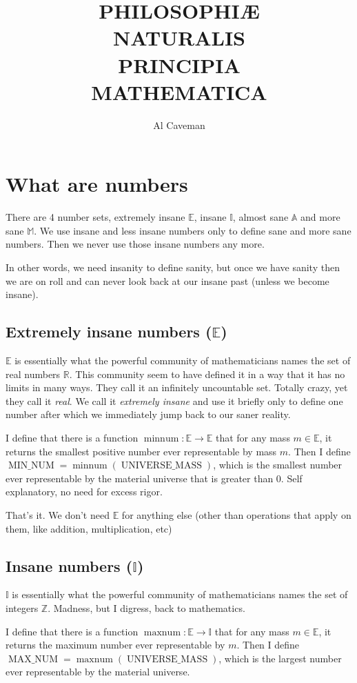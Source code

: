 \documentclass{report}
\title{\Huge\sc \textbf{PHILOSOPHI\AE}\\ NATURALIS\\ \textbf{PRINCIPIA}\\ MATHEMATICA}
\author{Al Caveman}
\DeclareMathOperator{\maxn}{maxnum}
\DeclareMathOperator{\minm}{minnum} \DeclareMathOperator{\maxnum}{MAX\_NUM}
\DeclareMathOperator{\minnum}{MIN\_NUM}
\DeclareMathOperator{\unimass}{UNIVERSE\_MASS}
\begin{document}
\maketitle
\tableofcontents

\chapter{What are numbers}
There are 4 number sets, extremely insane $\mathbb{E}$, insane $\mathbb{I}$,
almost sane $\mathbb{A}$ and more sane $\mathbb{M}$. We use insane and less
insane numbers only to define sane and more sane numbers. Then we never use
those insane numbers any more.

In other words, we need insanity to define sanity, but once we have sanity then
we are on roll and can never look back at our insane past (unless we become
insane).

\section{Extremely insane numbers ($\mathbb{E}$)}
$\mathbb{E}$ is essentially what the powerful community of mathematicians names
the set of real numbers $\mathbb{R}$. This community seem to have defined it in
a way that it has no limits in many ways. They call it an infinitely
uncountable set. Totally crazy, yet they call it \emph{real}. We call it
\emph{extremely insane} and use it briefly only to define one number after
which we immediately jump back to our saner reality.

I define that there is a function $\minm : \mathbb{E} \rightarrow
\mathbb{E}$ that for any mass $m \in \mathbb{E}$, it returns the smallest
positive number
ever representable by mass $m$.  Then I define $\minnum = \minm(\unimass)$, which is
the smallest number ever representable by the material universe that is greater
than 0. Self explanatory, no need for excess rigor.

That's it. We don't need $\mathbb{E}$ for anything else (other than
operations that apply on them, like addition, multiplication, etc)

\section{Insane numbers ($\mathbb{I}$)}
$\mathbb{I}$ is essentially what the powerful community of mathematicians names
the set of integers $\mathbb{Z}$. Madness, but I digress, back to mathematics.

I define that there is a function $\maxn : \mathbb{E} \rightarrow
\mathbb{I}$ that for any mass $m \in \mathbb{E}$, it returns the maximum number
ever representable by $m$. Then I define $\maxnum = \maxn(\unimass)$, which is
the largest number ever representable by the material universe.
\end{document}
